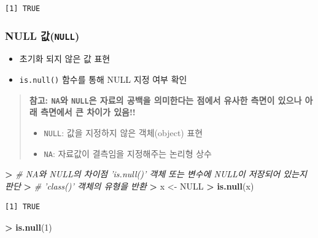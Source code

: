 \documentclass[11pt,a4paper]{book}
\newenvironment{Shaded}{\begin{snugshade}}{\end{snugshade}}
\newcommand{\KeywordTok}[1]{\textcolor[rgb]{0.13,0.29,0.53}{\textbf{#1}}}
\newcommand{\DecValTok}[1]{\textcolor[rgb]{0.00,0.00,0.81}{#1}}
\newcommand{\StringTok}[1]{\textcolor[rgb]{0.31,0.60,0.02}{#1}}
\newcommand{\CommentTok}[1]{\textcolor[rgb]{0.56,0.35,0.01}{\textit{#1}}}
\newcommand{\OtherTok}[1]{\textcolor[rgb]{0.56,0.35,0.01}{#1}}
\newcommand{\OperatorTok}[1]{\textcolor[rgb]{0.81,0.36,0.00}{\textbf{#1}}}
\newcommand{\ErrorTok}[1]{\textcolor[rgb]{0.64,0.00,0.00}{\textbf{#1}}}
\newcommand{\NormalTok}[1]{#1}
\providecommand{\tightlist}{%
  \setlength{\itemsep}{0pt}\setlength{\parskip}{0pt}}
\theoremstyle{definition}
\theoremstyle{definition}
\theoremstyle{definition}
\theoremstyle{remark}
\begin{document}
\begin{verbatim}
[1] TRUE
\end{verbatim}

\normalsize

\subsubsection{\texorpdfstring{NULL
값(\texttt{NULL})}{NULL 값(NULL)}}\label{null-null}

\begin{itemize}
\tightlist
\item
  초기화 되지 않은 값 표현
\item
  \texttt{is.null()} 함수를 통해 NULL 지정 여부 확인
\end{itemize}

\begin{quote}
\colorbox{gray!10}{\begin{minipage}{15cm}
\textbf{참고: \texttt{NA}와 \texttt{NULL}은 자료의 공백을 의미한다는 점에서 유사한 측면이 있으나 아래 측면에서 큰 차이가 있음!!}
\begin{itemize}
  \item \texttt{NULL}: 값을 지정하지 않은 객체(object) 표현
  \item \texttt{NA}: 자료값이 결측임을 지정해주는 논리형 상수
\end{itemize}
\end{minipage}}
\end{quote}

\vspace{0.5cm}

\footnotesize

\begin{Shaded}
\begin{Highlighting}[]
\OperatorTok{>}\StringTok{ }\CommentTok{# NA와 NULL의 차이점 'is.null()' 객체 또는 변수에 NULL이 저장되어 있는지 판단}
\ErrorTok{>}\StringTok{ }\CommentTok{# 'class()' 객체의 유형을 반환}
\ErrorTok{>}\StringTok{ }\NormalTok{x <-}\StringTok{ }\OtherTok{NULL}
\OperatorTok{>}\StringTok{ }\KeywordTok{is.null}\NormalTok{(x)}
\end{Highlighting}
\end{Shaded}

\begin{verbatim}
[1] TRUE
\end{verbatim}

\begin{Shaded}
\begin{Highlighting}[]
\OperatorTok{>}\StringTok{ }\KeywordTok{is.null}\NormalTok{(}\DecValTok{1}\NormalTok{)}
\end{Highlighting}
\end{Shaded}
\end{document}
